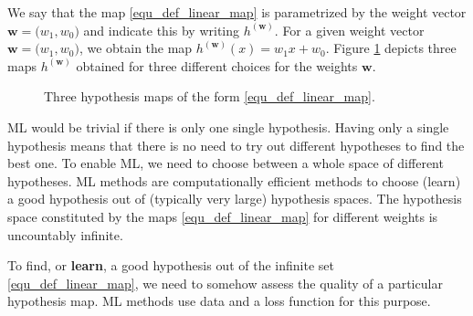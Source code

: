 \documentclass[12pt]{report}
\begin{document}
We say that the map \eqref{equ_def_linear_map} is parametrized by the weight vector 
$\mathbf{w}= \big(w_{1},w_{0}\big)$ and indicate this by writing $h^{(\mathbf{w})}$. 
For a given weight vector $\mathbf{w}= \big(w_{1},w_{0}\big)$, we obtain the map 
$h^{(\mathbf{w})}(x) = w_{1}x +w_{0}$. 
Figure \ref{fig_three_maps_example} depicts three maps $h^{(\mathbf{w})}$ 
obtained for three different choices for the weights $\mathbf{w}$.  
\begin{figure}[htbp]
	\begin{center}
		\vspace*{-4mm}
	\end{center}
	\caption{Three hypothesis maps of the form \eqref{equ_def_linear_map}.}
	\label{fig_three_maps_example}
\end{figure}

ML would be trivial if there is only one single hypothesis. Having 
only a single hypothesis means that there is no need to try out 
different hypotheses to find the best one. To enable ML, we need 
to choose between a whole space of different hypotheses. ML 
methods are computationally efficient methods to choose (learn) 
a good hypothesis out of (typically very large) hypothesis spaces. 
The hypothesis space constituted by the maps \eqref{equ_def_linear_map} 
for different weights is uncountably infinite. 

To find, or {\bf learn}, a good hypothesis out of the infinite 
set \eqref{equ_def_linear_map}, we need to somehow assess 
the quality of a particular hypothesis map. ML methods use 
data and a loss function for this purpose. 
\end{document}
